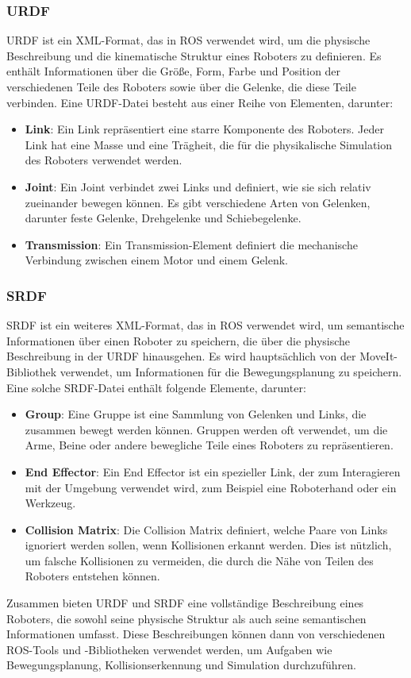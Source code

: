\subsubsection{URDF}\label{subsubsec:URDF}
\ac{URDF} ist ein \ac{XML}-Format, das in \ac{ROS} verwendet wird, um die physische Beschreibung und die kinematische Struktur eines Roboters zu definieren. Es enthält Informationen über die Größe, Form, Farbe und Position der verschiedenen Teile des Roboters sowie über die Gelenke, die diese Teile verbinden. Eine \ac{URDF}-Datei besteht aus einer Reihe von Elementen, darunter:
\begin{itemize}
    \item \textbf{Link}: Ein Link repräsentiert eine starre Komponente des Roboters. Jeder Link hat eine Masse und eine Trägheit, die für die physikalische Simulation des Roboters verwendet werden.
    \item \textbf{Joint}: Ein Joint verbindet zwei Links und definiert, wie sie sich relativ zueinander bewegen können. Es gibt verschiedene Arten von Gelenken, darunter feste Gelenke, Drehgelenke und Schiebegelenke.
    \item \textbf{Transmission}: Ein Transmission-Element definiert die mechanische Verbindung zwischen einem Motor und einem Gelenk.
\end{itemize}

\subsubsection{SRDF}\label{subsubsec:SRDF}
\ac{SRDF} ist ein weiteres \ac{XML}-Format, das in \ac{ROS} verwendet wird, um semantische Informationen über einen Roboter zu speichern, die über die physische Beschreibung in der URDF hinausgehen. Es wird hauptsächlich von der MoveIt-Bibliothek verwendet, um Informationen für die Bewegungsplanung zu speichern. Eine solche \ac{SRDF}-Datei enthält folgende Elemente, darunter:
\begin{itemize}
    \item \textbf{Group}: Eine Gruppe ist eine Sammlung von Gelenken und Links, die zusammen bewegt werden können. Gruppen werden oft verwendet, um die Arme, Beine oder andere bewegliche Teile eines Roboters zu repräsentieren.
    \item \textbf{End Effector}: Ein End Effector ist ein spezieller Link, der zum Interagieren mit der Umgebung verwendet wird, zum Beispiel eine Roboterhand oder ein Werkzeug.
    \item \textbf{Collision Matrix}: Die Collision Matrix definiert, welche Paare von Links ignoriert werden sollen, wenn Kollisionen erkannt werden. Dies ist nützlich, um falsche Kollisionen zu vermeiden, die durch die Nähe von Teilen des Roboters entstehen können.
\end{itemize}
Zusammen bieten \ac{URDF} und \ac{SRDF} eine vollständige Beschreibung eines Roboters, die sowohl seine physische Struktur als auch seine semantischen Informationen umfasst. Diese Beschreibungen können dann von verschiedenen \ac{ROS}-Tools und -Bibliotheken verwendet werden, um Aufgaben wie Bewegungsplanung, Kollisionserkennung und Simulation durchzuführen.




